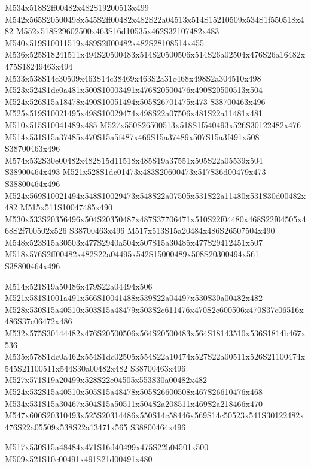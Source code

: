 \documentclass{article}
\begin{document}
\begin{multicols}{2}
M534x518S2ff00482x482S19200513x499 M542x565S20500498x545S2ff00482x482S22a04513x514S15210509x534S1f550518x482 M552x518S29602500x463S16d10535x462S32107482x483 M540x519S10011519x489S2ff00482x482S28108514x455 M536x525S18241511x494S20500483x514S20500506x514S26a02504x476S26a16482x475S18249463x494 M533x538S14c30509x463S14c38469x463S2a31c468x498S2a304510x498 M523x524S1dc0a481x500S10003491x476S20500476x490S20500513x504 M524x526S15a18478x490S10051494x505S26701475x473 S38700463x496 M525x519S10021495x498S10029474x498S22a07506x481S22a11481x481 M510x515S10041489x485 M527x550S26500513x518S1f540493x526S30122482x476 M514x531S15a37485x470S15a5f487x469S15a37489x507S15a3f491x508 S38700463x496 M574x532S30e00482x482S15d11518x485S19a37551x505S22a05539x504 S38900464x493 M521x528S1dc01473x483S20600473x517S36d00479x473 S38800464x496 M524x569S10021494x548S10029473x548S22a07505x531S22a11480x531S30d00482x482 M515x511S10047485x490 M530x533S20356496x504S20350487x487S37706471x510S22f04480x468S22f04505x468S2f700502x526 S38700463x496 M517x513S15a20484x486S26507504x490 M548x523S15a30503x477S2940a504x507S15a30485x477S29412451x507 M518x576S2ff00482x482S22a04495x542S15000489x508S20300494x561 S38800464x496

M514x521S19a50486x479S22a04494x506 M521x581S1001a491x566S10041488x539S22a04497x530S30a00482x482 M528x530S15a40510x503S15a48479x503S2c611476x470S2c600506x470S37c06516x486S37c06472x486 M532x575S30144482x476S20500506x564S20500483x564S18143510x536S1814b467x536 M535x578S1dc0a462x554S1dc02505x554S22a10474x527S22a00511x526S21100474x545S21100511x544S30a00482x482 S38700463x496 M527x571S19a20499x528S22e04505x553S30a00482x482 M524x532S15a40510x505S15a48478x505S26600508x467S26610476x468 M534x531S15a30467x504S15a50511x504S2a208511x469S2a218466x470 M547x600S20310493x525S20314486x550S14c58446x569S14c50523x541S30122482x476S22a05509x538S22a13471x565 S38800464x496

\begin{center}
M517x530S15a48484x471S16d40499x475S22b04501x500 M509x521S10e00491x491S21d00491x480 
\end{center}



\end{multicols}
\end{document}

